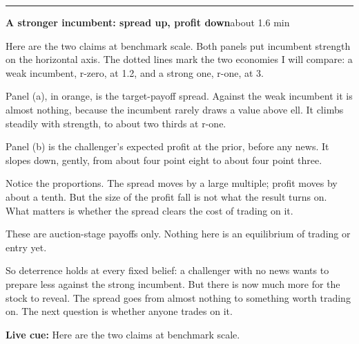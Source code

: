 \documentclass[11pt]{article}
\newcommand{\Cue}[1]{\par\nobreak\smallskip\noindent
  \textcolor{ScriptGray}{\footnotesize\textbf{Live cue:} #1}\par}
\newcommand{\scriptframe}[3]{%
  \Needspace{9\baselineskip}%
  \par\medskip\noindent\textcolor{ScriptBlue}{\rule{\linewidth}{0.55pt}}%
  \par\smallskip\noindent
  \textbf{#1}\hfill\textcolor{ScriptGray}{\small #2}\par\smallskip
  #3\par}
\begin{document}
\scriptframe{A stronger incumbent: spread up, profit down}{about 1.6 min}{%
  Here are the two claims at benchmark scale. Both panels put incumbent
  strength on the horizontal axis. The dotted lines mark the two economies I
  will compare: a weak incumbent, r-zero, at 1.2, and a strong one, r-one, at 3.

  Panel (a), in orange, is the target-payoff spread. Against the weak incumbent
  it is almost nothing, because the incumbent rarely draws a value above ell.
  It climbs steadily with strength, to about two thirds at r-one.

  Panel (b) is the challenger's expected profit at the prior, before any news.
  It slopes down, gently, from about four point eight to about four point three.

  Notice the proportions. The spread moves by a large multiple; profit moves by
  about a tenth. But the size of the profit fall is not what the result turns
  on. What matters is whether the spread clears the cost of trading on it.

  These are auction-stage payoffs only. Nothing here is an equilibrium of
  trading or entry yet.

  So deterrence holds at every fixed belief: a challenger with no news wants to
  prepare less against the strong incumbent. But there is now much more for the
  stock to reveal. The spread goes from almost nothing to something worth
  trading on. The next question is whether anyone trades on it.
  \Cue{Here are the two claims at benchmark scale.}
}
\end{document}
